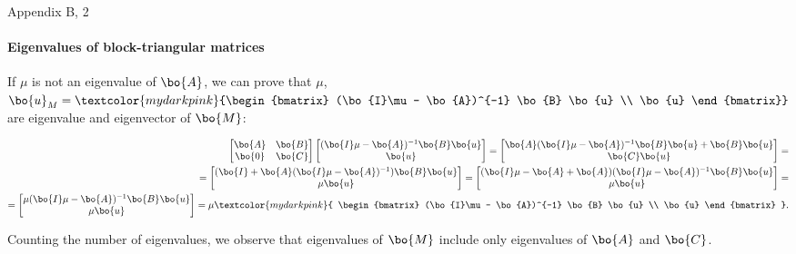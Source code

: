 \documentclass{beamer}
\begin{document}
\begin{frame}{Appendix B, 2}
	\framesubtitle{Eigenvalues of block-triangular matrices}
	\begin{flushleft}
		
		If $\mu$ is not an eigenvalue of $\bo{A}$, we can prove that $\mu$, $\bo{u}_M = \textcolor{mydarkpink}{\begin{bmatrix}
				(\bo{I}\mu - \bo{A})^{-1} \bo{B} \bo{u}  \\  \bo{u} 
		\end{bmatrix}}$ are eigenvalue and eigenvector of $\bo{M}$:
	
		\begin{align*}
	\begin{bmatrix}
		\bo{A} & \bo{B} \\ \bo{0} & \bo{C}
	\end{bmatrix}
\begin{bmatrix}
	(\bo{I}\mu - \bo{A})^{-1}\bo{B} \bo{u}  \\  \bo{u} 
\end{bmatrix}
	=
	\begin{bmatrix}
		\bo{A}(\bo{I}\mu - \bo{A})^{-1}\bo{B} \bo{u} + \bo{B} \bo{u}
		 \\ 
		 \bo{C}\bo{u}
	\end{bmatrix}
	= \\
	=
	\begin{bmatrix}
		(\bo{I}+\bo{A}(\bo{I}\mu - \bo{A})^{-1}) \bo{B} \bo{u}
		\\ 
		\mu \bo{u}
	\end{bmatrix} 
=
	\begin{bmatrix}
	(\bo{I}\mu - \bo{A}+\bo{A})(\bo{I}\mu - \bo{A})^{-1} \bo{B} \bo{u}
	\\ 
	\mu \bo{u}
	\end{bmatrix} 
= \\
=
	\begin{bmatrix}
	\mu(\bo{I}\mu - \bo{A})^{-1} \bo{B} \bo{u}
	\\ 
	\mu \bo{u}
	\end{bmatrix} 
=
\mu 
\textcolor{mydarkpink}{
\begin{bmatrix}
(\bo{I}\mu - \bo{A})^{-1} \bo{B} \bo{u}
\\ 
\bo{u}
\end{bmatrix} 
}.
	\end{align*}	
	
	
	
	Counting the number of eigenvalues, we observe that eigenvalues of $\bo{M}$ include only eigenvalues of $\bo{A}$ and $\bo{C}$.
		
	\end{flushleft}
\end{frame}
\end{document}
